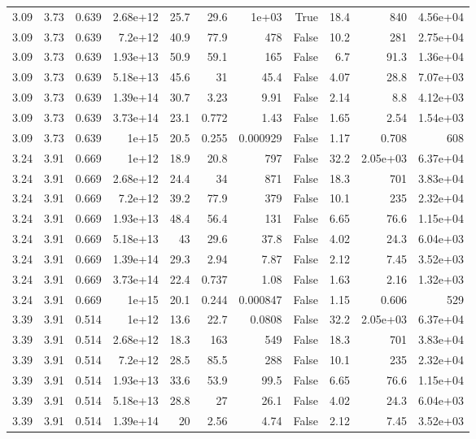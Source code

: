 \begin{table}
\begin{tabular}{rrrrrrrrrrr}
3.09 & 3.73 & 0.639 & 2.68e+12 & 25.7 & 29.6 & 1e+03 & True & 18.4 & 840 & 4.56e+04 \\
3.09 & 3.73 & 0.639 & 7.2e+12 & 40.9 & 77.9 & 478 & False & 10.2 & 281 & 2.75e+04 \\
3.09 & 3.73 & 0.639 & 1.93e+13 & 50.9 & 59.1 & 165 & False & 6.7 & 91.3 & 1.36e+04 \\
3.09 & 3.73 & 0.639 & 5.18e+13 & 45.6 & 31 & 45.4 & False & 4.07 & 28.8 & 7.07e+03 \\
3.09 & 3.73 & 0.639 & 1.39e+14 & 30.7 & 3.23 & 9.91 & False & 2.14 & 8.8 & 4.12e+03 \\
3.09 & 3.73 & 0.639 & 3.73e+14 & 23.1 & 0.772 & 1.43 & False & 1.65 & 2.54 & 1.54e+03 \\
3.09 & 3.73 & 0.639 & 1e+15 & 20.5 & 0.255 & 0.000929 & False & 1.17 & 0.708 & 608 \\
3.24 & 3.91 & 0.669 & 1e+12 & 18.9 & 20.8 & 797 & False & 32.2 & 2.05e+03 & 6.37e+04 \\
3.24 & 3.91 & 0.669 & 2.68e+12 & 24.4 & 34 & 871 & False & 18.3 & 701 & 3.83e+04 \\
3.24 & 3.91 & 0.669 & 7.2e+12 & 39.2 & 77.9 & 379 & False & 10.1 & 235 & 2.32e+04 \\
3.24 & 3.91 & 0.669 & 1.93e+13 & 48.4 & 56.4 & 131 & False & 6.65 & 76.6 & 1.15e+04 \\
3.24 & 3.91 & 0.669 & 5.18e+13 & 43 & 29.6 & 37.8 & False & 4.02 & 24.3 & 6.04e+03 \\
3.24 & 3.91 & 0.669 & 1.39e+14 & 29.3 & 2.94 & 7.87 & False & 2.12 & 7.45 & 3.52e+03 \\
3.24 & 3.91 & 0.669 & 3.73e+14 & 22.4 & 0.737 & 1.08 & False & 1.63 & 2.16 & 1.32e+03 \\
3.24 & 3.91 & 0.669 & 1e+15 & 20.1 & 0.244 & 0.000847 & False & 1.15 & 0.606 & 529 \\
3.39 & 3.91 & 0.514 & 1e+12 & 13.6 & 22.7 & 0.0808 & False & 32.2 & 2.05e+03 & 6.37e+04 \\
3.39 & 3.91 & 0.514 & 2.68e+12 & 18.3 & 163 & 549 & False & 18.3 & 701 & 3.83e+04 \\
3.39 & 3.91 & 0.514 & 7.2e+12 & 28.5 & 85.5 & 288 & False & 10.1 & 235 & 2.32e+04 \\
3.39 & 3.91 & 0.514 & 1.93e+13 & 33.6 & 53.9 & 99.5 & False & 6.65 & 76.6 & 1.15e+04 \\
3.39 & 3.91 & 0.514 & 5.18e+13 & 28.8 & 27 & 26.1 & False & 4.02 & 24.3 & 6.04e+03 \\
3.39 & 3.91 & 0.514 & 1.39e+14 & 20 & 2.56 & 4.74 & False & 2.12 & 7.45 & 3.52e+03 \\

\end{tabular}
\end{table}
